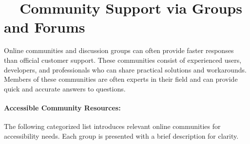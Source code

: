 \section{~~Community Support via Groups and Forums}
\label{app1:community}
Online communities and discussion groups can often provide faster responses than official customer support. These communities consist of experienced users, developers, and  professionals who can share practical solutions and workarounds. Members of these communities are often experts in their field and can provide quick and accurate answers to questions.

\paragraph{Accessible Community Resources:}
The following categorized list introduces relevant online communities for  accessibility needs. Each group is presented with a brief description for  clarity.


